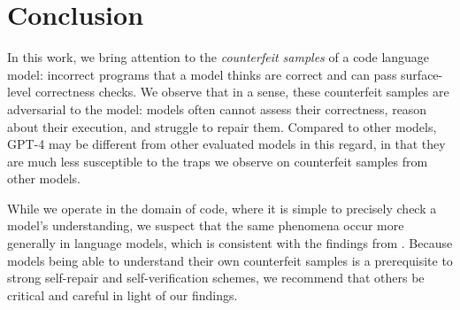 \section{Conclusion}
In this work, we bring attention to the \textit{counterfeit samples} of a code language model: incorrect programs that a model thinks are correct and can pass surface-level correctness checks. We observe that in a sense, these counterfeit samples are adversarial to the model: models often cannot assess their correctness, reason about their execution, and struggle to repair them. Compared to other models, GPT-4 may be different from other evaluated models in this regard, in that they are much less susceptible to the traps we observe on counterfeit samples from other models.

While we operate in the domain of code, where it is simple to precisely check a model's understanding, we suspect that the same phenomena occur more generally in language models, which is consistent with the findings from \citet{west2023generative}. Because models being able to understand their own counterfeit samples is a prerequisite to strong self-repair and self-verification schemes, we recommend that others be critical and careful in light of our findings.


